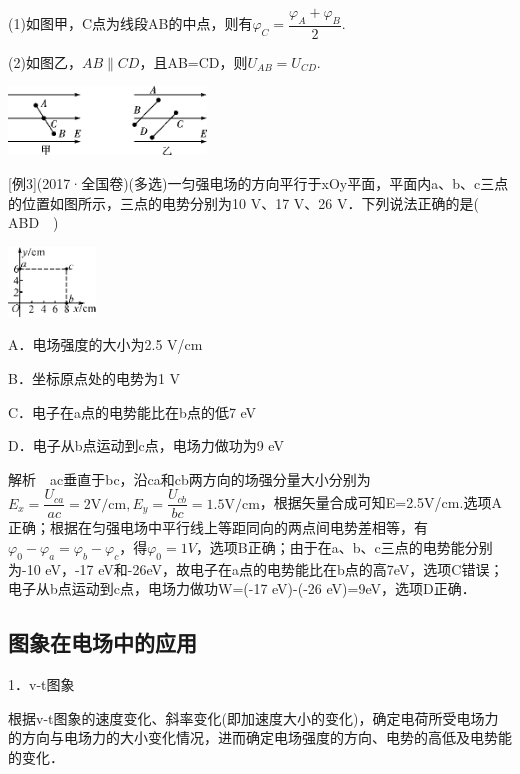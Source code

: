 \documentclass[cn,10.5pt,chinese,mac,chinesefont=founder]{elegantbook}
\begin{document}
(1)如图甲，C点为线段AB的中点，则有$\varphi_{C}=\dfrac{\varphi_{A}+\varphi_{B}}{2}$.

(2)如图乙，$A B \| C D$，且AB=CD，则$U_{A B}=U_{C D}$.

\begin{center}\includegraphics[width=2.07292in,height=0.71875in]{media/image282.png}\end{center}
{[}例3{]}(2017·全国卷\uppercase\expandafter{})(多选)一匀强电场的方向平行于xOy平面，平面内a、b、c三点的位置如图所示，三点的电势分别为10
V、17 V、26 V．下列说法正确的是(　ABD　)

\begin{center}\includegraphics[width=0.91667in,height=0.72917in]{media/image283.png}\end{center}

A．电场强度的大小为2.5 V/cm

B．坐标原点处的电势为1 V

C．电子在a点的电势能比在b点的低7 eV

D．电子从b点运动到c点，电场力做功为9 eV

解析　ac垂直于bc，沿ca和cb两方向的场强分量大小分别为$E_{x}=\dfrac{U_{c a}}{a c}=2 \mathrm{V} / \mathrm{cm}, E_{y}=\dfrac{U_{c b}}{b c}=1.5 \mathrm{V} / \mathrm{cm}$，根据矢量合成可知E=2.5V/cm.选项A正确；根据在匀强电场中平行线上等距同向的两点间电势差相等，有$\varphi_{0}-\varphi_{a}=\varphi_{b}-\varphi_{c}$，得$\varphi_{0}=1V$，选项B正确；由于在a、b、c三点的电势能分别为-10 eV，-17 eV和-26eV，故电子在a点的电势能比在b点的高7eV，选项C错误；电子从b点运动到c点，电场力做功W=(-17 eV)-(-26 eV)=9eV，选项D正确．

\subsection{图象在电场中的应用}

1．v-t图象

根据v-t图象的速度变化、斜率变化(即加速度大小的变化)，确定电荷所受电场力的方向与电场力的大小变化情况，进而确定电场强度的方向、电势的高低及电势能的变化．
\end{document}
